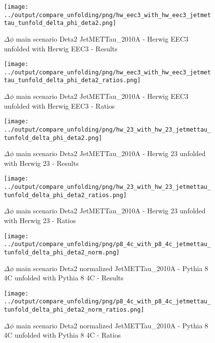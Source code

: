 \documentclass[11pt]{book}
\begin{document}
\begin{figure}[ht]
\centering
\texttt{[image: ../output/compare\_unfolding/png/hw\_eec3\_with\_hw\_eec3\_jetmettau\_tunfold\_delta\_phi\_deta2.png]}
\caption{$\Delta\phi$ main scenario Deta2 JetMETTau\_2010A - Herwig EEC3 unfolded with Herwig EEC3 - Results}
\label{hw_eec3_hw_eec3_jetmettau_tunfold_delta_phi_deta2_a}
\end{figure}

\begin{figure}[ht]
\centering
\texttt{[image: ../output/compare\_unfolding/png/hw\_eec3\_with\_hw\_eec3\_jetmettau\_tunfold\_delta\_phi\_deta2\_ratios.png]}
\caption{$\Delta\phi$ main scenario Deta2 JetMETTau\_2010A - Herwig EEC3 unfolded with Herwig EEC3 - Ratios}
\label{hw_eec3_hw_eec3_jetmettau_tunfold_delta_phi_deta2_b}
\end{figure}

\begin{figure}[ht]
\centering
\texttt{[image: ../output/compare\_unfolding/png/hw\_23\_with\_hw\_23\_jetmettau\_tunfold\_delta\_phi\_deta2.png]}
\caption{$\Delta\phi$ main scenario Deta2 JetMETTau\_2010A - Herwig 23 unfolded with Herwig 23 - Results}
\label{hw_23_hw_23_jetmettau_tunfold_delta_phi_deta2_a}
\end{figure}

\begin{figure}[ht]
\centering
\texttt{[image: ../output/compare\_unfolding/png/hw\_23\_with\_hw\_23\_jetmettau\_tunfold\_delta\_phi\_deta2\_ratios.png]}
\caption{$\Delta\phi$ main scenario Deta2 JetMETTau\_2010A - Herwig 23 unfolded with Herwig 23 - Ratios}
\label{hw_23_hw_23_jetmettau_tunfold_delta_phi_deta2_b}
\end{figure}


\begin{figure}[ht]
\centering
\texttt{[image: ../output/compare\_unfolding/png/p8\_4c\_with\_p8\_4c\_jetmettau\_tunfold\_delta\_phi\_deta2\_norm.png]}
\caption{$\Delta\phi$ main scenario Deta2 normalized JetMETTau\_2010A - Pythia 8 4C unfolded with Pythia 8 4C - Results}
\label{p8_p8_jetmettau_tunfold_delta_phi_deta2_norm_a}
\end{figure}

\begin{figure}[ht]
\centering
\texttt{[image: ../output/compare\_unfolding/png/p8\_4c\_with\_p8\_4c\_jetmettau\_tunfold\_delta\_phi\_deta2\_norm\_ratios.png]}
\caption{$\Delta\phi$ main scenario Deta2 normalized JetMETTau\_2010A - Pythia 8 4C unfolded with Pythia 8 4C - Ratios}
\label{p8_p8_jetmettau_tunfold_delta_phi_deta2_norm_b}
\end{figure}
\end{document}
